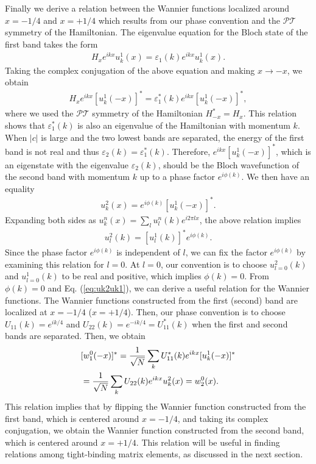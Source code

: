 \documentclass[prb,superscriptaddress,floatfix,twocolumn,showpacs]{revtex4-2}
\begin{document}
Finally we derive a relation between the Wannier functions localized around $x = -1/4$ and $x = +1/4$ which results from our phase convention and the $\mathcal{PT}$ symmetry of the Hamiltonian. 
The eigenvalue equation for the Bloch state of the first band takes the form
\begin{align}
    H_x e^{ikx}u_{k}^1(x) = \varepsilon_1 (k) e^{ikx} u_k^1 (x).
    \label{eq:eigen-equation_1}
\end{align}
Taking the complex conjugation of the above equation and making $x \to -x$, we obtain 
\begin{align}
    H_x e^{ikx} [u_{k}^1(-x)]^* = \varepsilon_1^* (k) e^{ikx} [u_k^1 (-x)]^*,
    \label{eq:eigen-equation_1_pt-pair}
\end{align}
where we used the $\mathcal{PT}$ symmetry of the Hamiltonian $H_{-x}^* = H_x$.
This relation shows that $\varepsilon_1^* (k)$ is also an eigenvalue of the Hamiltonian with momentum $k$. 
When $|c|$ is large and the two lowest bands are separated, the energy of the first band is not real and thus $\varepsilon_2 (k) = \varepsilon_1^* (k)$. 
Therefore, $e^{ikx}[u_k^1 (-x)]^*$, which is an eigenstate with the eigenvalue $\varepsilon_2 (k)$, should be the Bloch wavefunction of the second band with momentum $k$ up to a phase factor $e^{i\phi (k)}$. 
We then have an equality
\begin{align}
    u_k^2 (x) = e^{i\phi (k)} [u_k^1 (-x)]^*. \label{eq:uk2uk1}
\end{align}
Expanding both sides as $u_k^n (x) = \sum_l u_l^n(k) e^{i2\pi lx}$, the above relation implies
\begin{align}
    u_l^2 (k) = [u_l^1 (k)]^* e^{i\phi(k)}.
\end{align}
Since the phase factor $e^{i\phi(k)}$ is independent of $l$, we can fix the factor $e^{i\phi(k)}$ by examining this relation for $l = 0$. 
At $l=0$, our convention is to choose $u_{l=0}^2 (k)$ and $u_{l=0}^1 (k)$ to be real and positive, which implies $\phi(k) = 0$.
From $\phi(k) = 0$ and Eq. (\ref{eq:uk2uk1}), we can derive a useful relation for the Wannier functions.
The Wannier functions constructed from the first (second) band are localized at $x = -1/4$ ($x = +1/4$).
Then, our phase convention is to choose $U_{11}(k)= e^{ik/4}$ and $U_{22}(k)=e^{-ik/4}= U_{11}^*(k)$ when the first and second bands are separated. 
Then, we obtain
\begin{align}
    &[w_1^0 (-x)]^*
    =
    \frac{1}{\sqrt{N}}\sum_k U_{11}^\ast(k) e^{ikx} [u_k^1 (-x)]^*
    \notag \\
    &=
    \frac{1}{\sqrt{N}}\sum_k U_{22}(k) e^{ikx} u_k^2 (x)
    =
    w_2^0 (x).
\end{align}
This relation implies that by flipping the Wannier function constructed from the first band, which is centered around $x=-1/4$, and taking its complex conjugation, we obtain the Wannier function constructed from the second band, which is centered around $x = +1/4$. 
This relation will be useful in finding relations among tight-binding matrix elements, as discussed in the next section.
\end{document}
